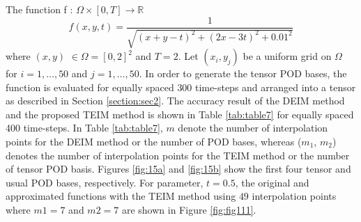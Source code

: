\documentclass{article}
\begin{document}
The function f : $\Omega \times [0,T]\rightarrow \mathbb{R}$
 \begin{equation*}
     f(x,y,t) =\frac{1}{\sqrt{(x+y-t)^2+(2x-3t)^2+0.01^2}}
  \end{equation*} 
where $(x,y)$ $\in \Omega= [0,2]^2$ and $T =2$. Let $(x_i,y_j)$ be a uniform grid on $\Omega$ for $i=1,\dots,50$ and $j=1,\dots , 50$. In order to generate the tensor POD bases, the function is evaluated for equally spaced $300$ time-steps and arranged into a tensor as described in Section \ref{section:sec2}. The accuracy result of the DEIM method \cite{DEIM} and the proposed TEIM method is shown in Table \ref{tab:table7} for equally spaced 400 time-steps. In Table \ref{tab:table7}, $m$ denote the number of interpolation points for the DEIM method or the number of POD bases, whereas ($m_1$, $m_2$) denotes the number of interpolation points for the TEIM method or the number of tensor POD basis. Figures \ref{fig:15a}  and \ref{fig:15b} show the first four tensor and usual POD bases, respectively. For parameter, $t=0.5$, the
original and approximated functions with the TEIM method using $49$ interpolation points where $m1=7$ and $m2=7$ are shown in Figure \ref{fig:fig111}.  
\end{document}
